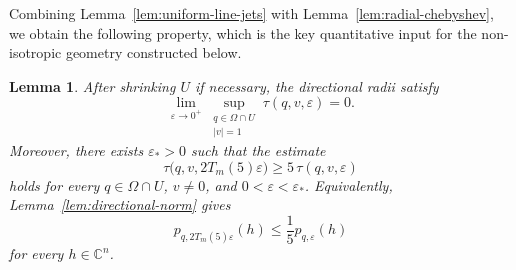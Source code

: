\documentclass[11pt]{article}
\newtheorem{lemma}[theorem]{Lemma}
\theoremstyle{definition}
\newcommand{\C}{\mathbb{C}}
\newcommand{\eps}{\varepsilon}
\begin{document}
Combining Lemma~\ref{lem:uniform-line-jets} with
Lemma~\ref{lem:radial-chebyshev}, we obtain the following
property, which is the key quantitative input for the non-isotropic geometry
constructed below.

\begin{lemma}\label{lem:finite-type-dilation}
	After shrinking \(U\) if necessary, the directional radii satisfy
	\begin{equation*}
		\lim_{\eps\to0^+}
		\sup_{\substack{q\in\Omega\cap U\\ |v|=1}}
		\tau(q,v,\eps)
		=0.
	\end{equation*}
	Moreover, there exists \(\eps_*>0\) such that the estimate
	\begin{equation*}
		\tau\bigl(q,v,2T_m(5)\eps\bigr)
		\ge
		5\,\tau(q,v,\eps)
	\end{equation*}
	holds for every \(q\in\Omega\cap U\), \(v\ne0\), and
	\(0<\eps<\eps_*\).
	Equivalently, Lemma~\ref{lem:directional-norm} gives
	\[
	p_{q,2T_m(5)\eps}(h)
	\le
	\frac15 p_{q,\eps}(h)
	\]
	for every \(h\in\C^n\).
\end{lemma}
\end{document}
